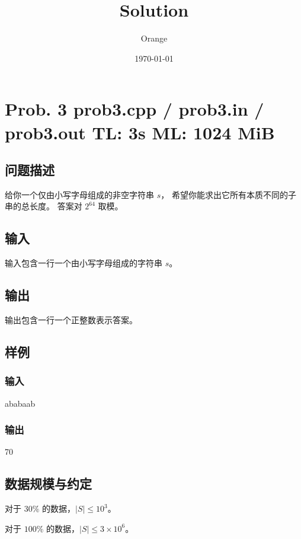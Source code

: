 \documentclass[UTF8]{article}
\title{Solution}
\author{Orange}
\date{\today}
\begin{document}
	\heiti

	\section{Prob. 3 \small {prob3.cpp / prob3.in / prob3.out} TL: 3s ML: 1024 MiB}

	\subsection{问题描述}

	给你一个仅由小写字母组成的非空字符串 $s$，
	希望你能求出它所有本质不同的子串的总长度。
	答案对 $2^{64}$ 取模。

	\subsection{输入}

	输入包含一行一个由小写字母组成的字符串 $s$。

	\subsection{输出}

	输出包含一行一个正整数表示答案。

	\subsection{样例}

	\subsubsection{输入}

	ababaab

	\subsubsection{输出}

	70

	\subsection{数据规模与约定}

	对于 $30\%$ 的数据，$|S| \le 10^3$。

	对于 $100\%$ 的数据，$|S| \le 3 \times 10^6$。
\end{document}
